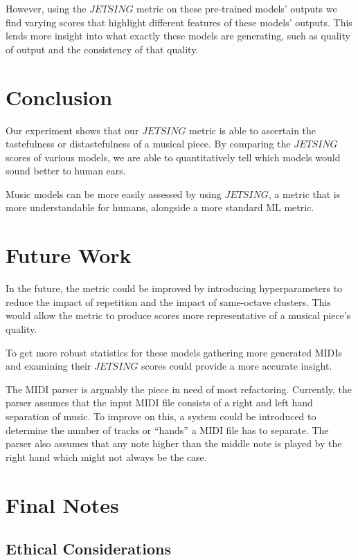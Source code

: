 \documentclass[11pt]{article}
\begin{document}
However, using the $JETSING$ metric on these pre-trained models' outputs we find varying scores that highlight different features of these models' outputs.
This lends more insight into what exactly these models are generating, such as quality of output and the consistency of that quality.

\section{Conclusion}

Our experiment shows that our $JETSING$ metric is able to ascertain the tastefulness or distastefulness of a musical piece.
By comparing the $JETSING$ scores of various models, we are able to quantitatively tell which models would sound better to human ears.

Music models can be more easily assessed by using $JETSING$, a metric that is more understandable for humans, alongside a more standard ML metric.

\section{Future Work}

In the future, the metric could be improved by introducing hyperparameters to reduce the impact of repetition and the impact of same-octave clusters.
This would allow the metric to produce scores more representative of a musical piece's quality.

To get more robust statistics for these models gathering more generated MIDIs and examining their $JETSING$ scores could provide a more accurate insight.

The MIDI parser is arguably the piece in need of most refactoring.
Currently, the parser assumes that the input MIDI file consists of a right and left hand separation of music.
To improve on this, a system could be introduced to determine the number of tracks or “hands” a MIDI file has to separate.
The parser also assumes that any note higher than the middle note is played by the right hand which might not always be the case.

\section{Final Notes}

\subsection{Ethical Considerations}
\end{document}

